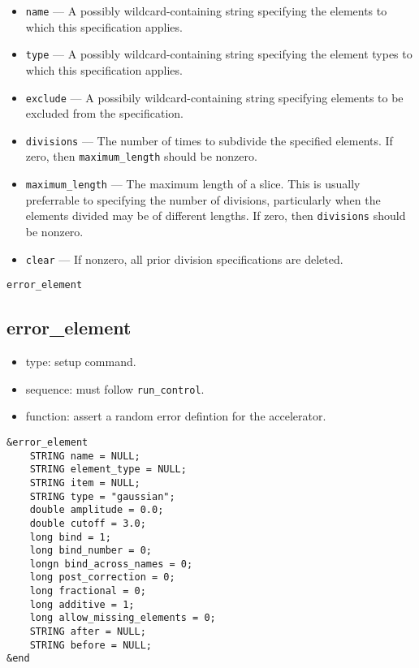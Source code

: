 \documentclass[11pt]{article}
\begin{document}
\begin{itemize}
\item \verb|name| --- A possibly wildcard-containing string specifying
	the elements to which this specification applies.
\item \verb|type| --- A possibly wildcard-containing string specifying
 	the element types to which this specification applies.
\item \verb|exclude| --- A possibily wildcard-containing string specifying
 	elements to be excluded from the specification.
\item \verb|divisions| --- The number of times to subdivide the specified
	elements.  If zero, then \verb|maximum_length| should be nonzero.
\item \verb|maximum_length| --- The maximum length of a slice.  This is
	usually preferrable to specifying the number of divisions, particularly
	when the elements divided may be of different lengths.  If zero, then
	\verb|divisions| should be nonzero.
\item \verb|clear| --- If nonzero, all prior division specifications are
	deleted.
\end{itemize}

\newpage
\begin{center}{\Large\verb|error_element|}\end{center}
\subsection{error\_element \label{subsec:errorelement}}

\begin{itemize}
\item type: setup command.
\item sequence: must follow \verb|run_control|.
\item function: assert a random error defintion for the accelerator.
\end{itemize}

\begin{verbatim}
&error_element
    STRING name = NULL;
    STRING element_type = NULL;
    STRING item = NULL;
    STRING type = "gaussian";
    double amplitude = 0.0;
    double cutoff = 3.0;
    long bind = 1;
    long bind_number = 0;
    longn bind_across_names = 0;
    long post_correction = 0;
    long fractional = 0;
    long additive = 1;
    long allow_missing_elements = 0;
    STRING after = NULL;
    STRING before = NULL;
&end
\end{verbatim}
\end{document}
